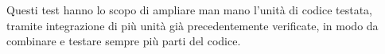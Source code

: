 Questi test hanno lo scopo di ampliare man mano l’unità di codice testata, tramite integrazione di più unità già precedentemente verificate, in modo da combinare e testare sempre più parti del codice.